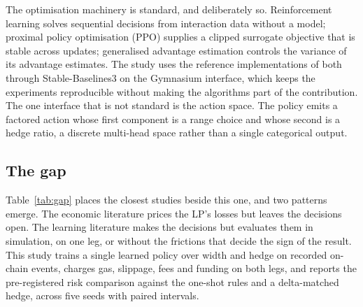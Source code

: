 The optimisation machinery is standard, and deliberately so. Reinforcement
learning solves sequential decisions from interaction data without a
model\cite{sutton2018reinforcement}; proximal policy optimisation (PPO)
supplies a clipped surrogate objective that is stable across
updates\cite{schulman2017ppo}; generalised advantage estimation controls the
variance of its advantage estimates\cite{schulman2015gae}. The study uses the
reference implementations of both through Stable-Baselines3 on the Gymnasium
interface\cite{raffin2021stablebaselines3,towers2024gymnasium}, which keeps
the experiments reproducible without making the algorithms part of the
contribution. The one interface that is not standard is the action space. The
policy emits a factored action whose first component is a range choice and
whose second is a hedge ratio, a discrete multi-head space rather than a
single categorical output.

\subsection{The gap}

Table~\ref{tab:gap} places the closest studies beside this one, and two
patterns emerge. The economic literature prices the LP's losses but leaves the
decisions open. The learning literature makes the decisions but evaluates them
in simulation, on one leg, or without the frictions that decide the sign of the
result. This study trains a single learned policy over width and hedge on
recorded on-chain events, charges gas, slippage, fees and funding on both legs,
and reports the pre-registered risk comparison against the one-shot rules and a
delta-matched hedge, across five seeds with paired intervals.

